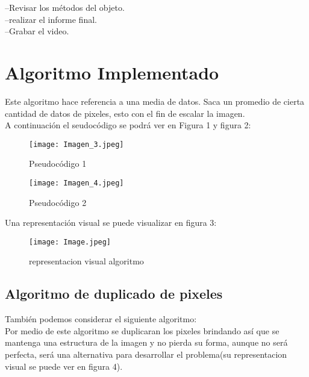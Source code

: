 \documentclass{article}
\begin{document}
--Revisar los métodos del objeto.\\

--realizar el informe final.\\

--Grabar el video.\\

\section{Algoritmo Implementado}

Este algoritmo hace referencia a una media de datos. Saca un promedio de cierta cantidad de datos de pixeles, esto con el fin de escalar la imagen.\\

A continuación el seudocódigo se podrá ver en Figura 1 y figura 2:\\

\begin{figure}[h]
\texttt{[image: Imagen\_3.jpeg]}
\centering
\caption{Pseudocódigo 1}
\label{fig:Imagen_4}
\end{figure}



\begin{figure}[h]
\texttt{[image: Imagen\_4.jpeg]}
\centering
\caption{Pseudocódigo 2}
\label{fig:Imagen_4}
\end{figure}



Una representación visual se puede visualizar en figura 3:\\

\begin{figure}[h]
\texttt{[image: Image.jpeg]}
\centering
\caption{representacion visual algoritmo}
\label{fig:Image}
\end{figure}

\subsection{Algoritmo de duplicado de pixeles}

También podemos considerar el siguiente algoritmo:\\

Por medio de este algoritmo se duplicaran los pixeles brindando así que se mantenga una estructura de la imagen y no pierda su forma, aunque no será perfecta, será una alternativa para desarrollar el problema(su representacion visual se puede ver en figura 4).
\end{document}
